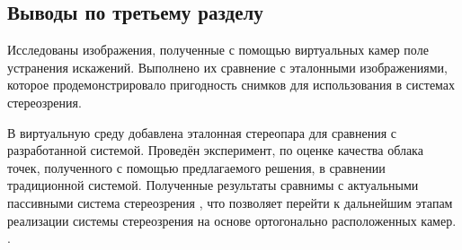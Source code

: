 \subsection{Выводы по третьему разделу}

Исследованы изображения, полученные с помощью виртуальных камер поле устранения искажений. Выполнено их сравнение 
с эталонными изображениями,  которое продемонстрировало пригодность снимков для использования в системах стереозрения.

В виртуальную среду добавлена эталонная стереопара для сравнения с разработанной системой. Проведён эксперимент,
по оценке качества облака точек, полученного с помощью предлагаемого решения, в сравнении  традиционной системой.
Полученные результаты сравнимы с актуальными пассивными система стереозрения \cite{passive_perf}, что позволяет перейти
к дальнейшим этапам реализации системы стереозрения на основе ортогонально расположенных камер. . 


